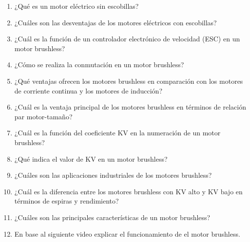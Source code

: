 \documentclass[../main]{subfiles}
\begin{document}
\begin{enumerate}
\item ¿Qué es un motor eléctrico sin escobillas?
\item ¿Cuáles son las desventajas de los motores eléctricos con escobillas?
\item ¿Cuál es la función de un controlador electrónico de velocidad (ESC) en un motor brushless?
\item ¿Cómo se realiza la conmutación en un motor brushless?
\item ¿Qué ventajas ofrecen los motores brushless en comparación con los motores de corriente continua y los motores de inducción?
\item ¿Cuál es la ventaja principal de los motores brushless en términos de relación par motor-tamaño?
\item ¿Cuál es la función del coeficiente KV en la numeración de un motor brushless?
\item ¿Qué indica el valor de KV en un motor brushless?
\item ¿Cuáles son las aplicaciones industriales de los motores brushless?
\item ¿Cuál es la diferencia entre los motores brushless con KV alto y KV bajo en términos de espiras y rendimiento?
\item ¿Cuáles son las principales características de un motor brushless?
    \item En base al siguiente video explicar el funcionamiento de el motor brushless.
\end{enumerate}
\end{document}
